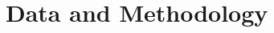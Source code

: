 \documentclass[12pt]{article}
\newcommand{\citee}[1]{\citename{#1} \citeyear{#1}}
\begin{document}
\begin{comment}

\subsection{Peer Effects}

This paper also contributes to a substantial literature that examines the influence of peers on students' academic performance, eventhough, this is not our main question. Besides providing food and shelter, residence hall administrators provide a variety of activities and services to create an environment that causes students to develop close relationships with each other and which encourages students to study and socialize together. The dynamics of social interactions and the influence of peers are likely to be different in dormitories than off-campus apartments.

Much of the peer effects literature focuses on primary and secondary education (see for example \citee{coleman1966}, \citee{hms1978}, \citee{er1998}, and \citee{hanushek2003}), but lately some authors are examining post-secondary education, such as \citee{ts2001}, \citee{zimmerman2003}. The general finding in this literature is that peer influences do exist, but the extent to which these are positive or negative is somewhat mixed. Henderson, \citee{hms1978} find statistical evidence that positive peer effects are greater than negative peer effects. That is, the positive influence of students who have more academic success is likely to be larger than the negative influence of students who have lesser academic success. \citee{bettsmorrell1999} find a somewhat contradictory result when following high school students through college. They find that negative influences of students' high school peers have persistent negative impacts on the students' college academic performance. \citee{zimmerman2003} finds that the college students who are most influenced by their peers, either positively or negatively, are
those whose SAT scores were in the middle of the distribution.

\end{comment}

\section{Data and Methodology}
\end{document}
